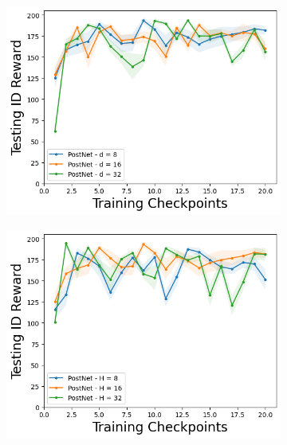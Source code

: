\begin{figure}
\centering
    \begin{subfigure}{.3\textwidth}
        \includegraphics[width=\textwidth]{sections/011_icml2022/resources/CartPole-v0-mean_reward_-testing-hyperparameter-flow_length-postnet.png}  
    \end{subfigure}
        \begin{subfigure}{.3\textwidth}
        \includegraphics[width=\textwidth]{sections/011_icml2022/resources/CartPole-v0-mean_reward_-testing-hyperparameter-latent_dim-postnet.png}  
    \end{subfigure}
        \begin{subfigure}{.3\textwidth}

\end{subfigure}
\end{figure}
